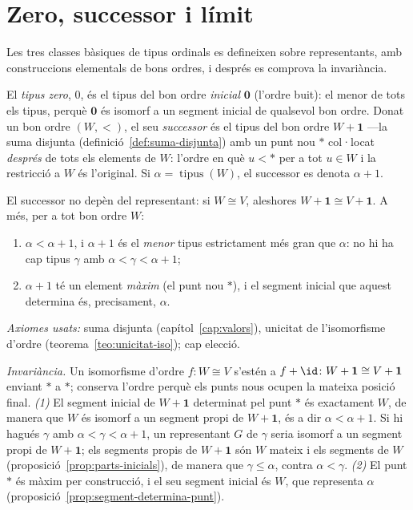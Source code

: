\section{Zero, successor i límit}\label{sec:zero-successor-limit}

Les tres classes bàsiques de tipus ordinals es defineixen sobre
representants, amb construccions elementals de bons ordres, i després es
comprova la invariància.

\begin{definicio}\label{def:zero-successor}
El \emph{tipus zero}, \(0\), és el tipus del bon ordre \emph{inicial}
\(\mathbf0\) (l'ordre buit): el menor de tots els tipus, perquè \(\mathbf0\) és
isomorf a un segment inicial de qualsevol bon ordre. Donat un bon ordre
\((W,<)\), el seu \emph{successor} és el tipus del bon ordre \(W+\mathbf1\)
---la suma disjunta (definició~\ref{def:suma-disjunta}) amb un punt nou
\(\ast\) col·locat \emph{després} de tots els elements de \(W\): l'ordre en
què \(u<\ast\) per a tot \(u\in W\) i la restricció a \(W\) és l'original. Si
\(\alpha=\operatorname{tipus}(W)\), el successor es denota \(\alpha+1\).
\end{definicio}

\begin{proposicio}\label{prop:successor-invariant}
El successor no depèn del representant: si \(W\cong V\), aleshores
\(W+\mathbf1\cong V+\mathbf1\). A més, per a tot bon ordre \(W\):
\begin{enumerate}
\item \(\alpha<\alpha+1\), i \(\alpha+1\) és el \emph{menor} tipus
estrictament més gran que \(\alpha\): no hi ha cap tipus \(\gamma\) amb
\(\alpha<\gamma<\alpha+1\);
\item \(\alpha+1\) té un element \emph{màxim} (el punt nou \(\ast\)), i el
segment inicial que aquest determina és, precisament, \(\alpha\).
\end{enumerate}
\emph{Axiomes usats:} suma disjunta (capítol~\ref{cap:valors}), unicitat de
l'isomorfisme d'ordre (teorema~\ref{teo:unicitat-iso}); cap elecció.
\end{proposicio}

\begin{prova}
\emph{Invariància.} Un isomorfisme d'ordre \(f\colon W\cong V\) s'estén a
\(f+\id\colon W+\mathbf1\cong V+\mathbf1\) enviant \(\ast\) a \(\ast\); conserva
l'ordre perquè els punts nous ocupen la mateixa posició final. \emph{(1)} El
segment inicial de \(W+\mathbf1\) determinat pel punt \(\ast\) és exactament
\(W\), de manera que \(W\) és isomorf a un segment propi de \(W+\mathbf1\), és a
dir \(\alpha<\alpha+1\). Si hi hagués \(\gamma\) amb \(\alpha<\gamma<\alpha+1\),
un representant \(G\) de \(\gamma\) seria isomorf a un segment propi de
\(W+\mathbf1\); els segments propis de \(W+\mathbf1\) són \(W\) mateix i els
segments de \(W\) (proposició~\ref{prop:parts-inicials}), de manera que
\(\gamma\le\alpha\), contra \(\alpha<\gamma\). \emph{(2)} El punt \(\ast\) és
màxim per construcció, i el seu segment inicial és \(W\), que representa
\(\alpha\) (proposició~\ref{prop:segment-determina-punt}).
\end{prova}

